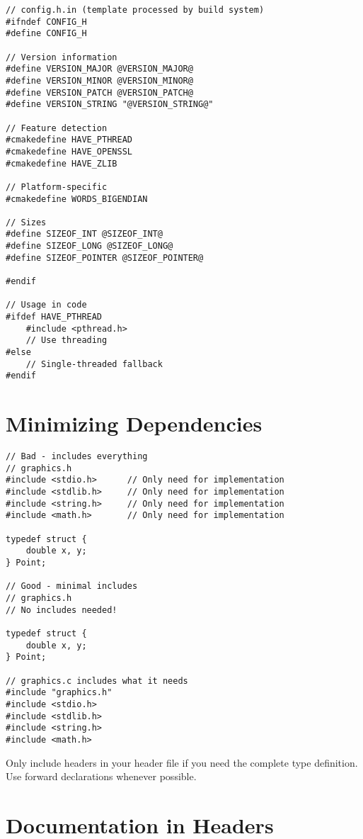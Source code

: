 \begin{lstlisting}
// config.h.in (template processed by build system)
#ifndef CONFIG_H
#define CONFIG_H

// Version information
#define VERSION_MAJOR @VERSION_MAJOR@
#define VERSION_MINOR @VERSION_MINOR@
#define VERSION_PATCH @VERSION_PATCH@
#define VERSION_STRING "@VERSION_STRING@"

// Feature detection
#cmakedefine HAVE_PTHREAD
#cmakedefine HAVE_OPENSSL
#cmakedefine HAVE_ZLIB

// Platform-specific
#cmakedefine WORDS_BIGENDIAN

// Sizes
#define SIZEOF_INT @SIZEOF_INT@
#define SIZEOF_LONG @SIZEOF_LONG@
#define SIZEOF_POINTER @SIZEOF_POINTER@

#endif

// Usage in code
#ifdef HAVE_PTHREAD
    #include <pthread.h>
    // Use threading
#else
    // Single-threaded fallback
#endif
\end{lstlisting}

\section{Minimizing Dependencies}

\begin{lstlisting}
// Bad - includes everything
// graphics.h
#include <stdio.h>      // Only need for implementation
#include <stdlib.h>     // Only need for implementation
#include <string.h>     // Only need for implementation
#include <math.h>       // Only need for implementation

typedef struct {
    double x, y;
} Point;

// Good - minimal includes
// graphics.h
// No includes needed!

typedef struct {
    double x, y;
} Point;

// graphics.c includes what it needs
#include "graphics.h"
#include <stdio.h>
#include <stdlib.h>
#include <string.h>
#include <math.h>
\end{lstlisting}

\begin{tipbox}
Only include headers in your header file if you need the complete type definition. Use forward declarations whenever possible.
\end{tipbox}

\section{Documentation in Headers}

